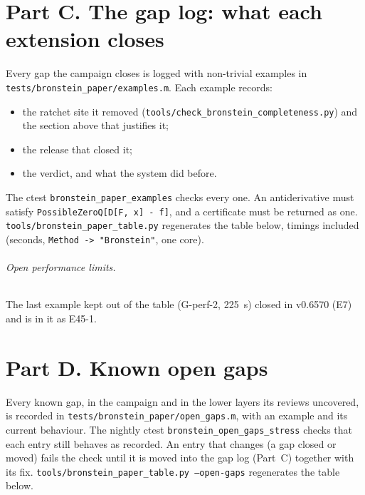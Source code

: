 \documentclass[11pt]{article}
\theoremstyle{definition}
\theoremstyle{remark}
\newcommand{\code}[1]{\texttt{#1}}
\begin{document}
\part*{Part C. The gap log: what each extension closes}

Every gap the campaign closes is logged with non-trivial examples in
\code{tests/bronstein\_paper/examples.m}. Each example records:
\begin{itemize}
\item the ratchet site it removed (\code{tools/check\_bronstein\_completeness.py})
  and the section above that justifies it;
\item the release that closed it;
\item the verdict, and what the system did before.
\end{itemize}
The ctest \code{bronstein\_paper\_examples} checks every one. An antiderivative
must satisfy \code{PossibleZeroQ[D[F, x] - f]}, and a certificate must be
returned as one. \code{tools/bronstein\_paper\_table.py} regenerates the table
below, timings included (seconds, \code{Method -> "Bronstein"}, one core).

\begingroup\small\sloppy

\endgroup

\paragraph{Open performance limits.} The last example kept out of the table
(G-perf-2, 225~s) closed in v0.6570 (E7) and is in it as E45-1.

\part*{Part D. Known open gaps}

Every known gap, in the campaign and in the lower layers its reviews uncovered,
is recorded in \code{tests/bronstein\_paper/open\_gaps.m}, with an example and its
current behaviour. The nightly ctest \code{bronstein\_open\_gaps\_stress} checks
that each entry still behaves as recorded. An entry that changes (a gap closed
or moved) fails the check until it is moved into the gap log (Part~C) together
with its fix. \code{tools/bronstein\_paper\_table.py --open-gaps} regenerates the
table below.

\begingroup\small\sloppy

\endgroup
\end{document}
